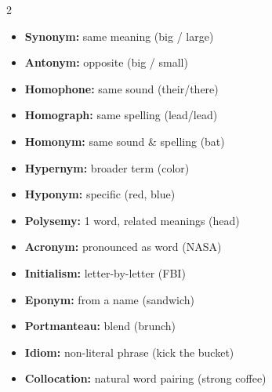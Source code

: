 \documentclass[11pt, letterpaper]{article}
\begin{document}
\vspace{4pt}

\begin{tcolorbox}[colback=part2bg, colframe=sectiongreen,
  title={\bfseries Vocabulary Concepts}, arc=3pt, boxrule=1pt]
\footnotesize
\begin{multicols}{2}
\begin{itemize}[noitemsep, leftmargin=*]
  \item \textbf{Synonym:} same meaning (big / large)
  \item \textbf{Antonym:} opposite (big / small)
  \item \textbf{Homophone:} same sound (their/there)
  \item \textbf{Homograph:} same spelling (lead/lead)
  \item \textbf{Homonym:} same sound \& spelling (bat)
  \item \textbf{Hypernym:} broader term (color)
  \item \textbf{Hyponym:} specific (red, blue)
\end{itemize}
\columnbreak
\begin{itemize}[noitemsep, leftmargin=*]
  \item \textbf{Polysemy:} 1 word, related meanings (head)
  \item \textbf{Acronym:} pronounced as word (NASA)
  \item \textbf{Initialism:} letter-by-letter (FBI)
  \item \textbf{Eponym:} from a name (sandwich)
  \item \textbf{Portmanteau:} blend (brunch)
  \item \textbf{Idiom:} non-literal phrase (kick the bucket)
  \item \textbf{Collocation:} natural word pairing (strong coffee)
\end{itemize}
\end{multicols}
\end{tcolorbox}

\vspace{4pt}
\end{document}

